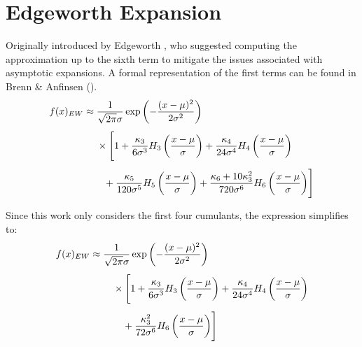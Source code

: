 \section{Edgeworth Expansion}
Originally introduced by Edgeworth \citeyear{edgeworthRepresentationStatisticalFrequency1907}, who suggested computing the approximation up to the sixth term to mitigate the issues associated with asymptotic expansions. A formal representation of the first terms can be found in Brenn \& Anfinsen (\citeyear{brennRevisitGramCharlierEdgeworth2017}).
\begin{align}
    f(x)_{EW} \approx &\; \frac{1}{\sqrt{2\pi}\sigma}\exp\left(-\frac{(x-\mu)^2}{2\sigma^2}\right) \notag\\[1ex]
    &\; \times \Biggl[ 1 
        + \frac{\kappa_3}{6\sigma^3}H_3\left(\frac{x-\mu}{\sigma}\right) + \frac{\kappa_4}{24\sigma^4}H_4\left(\frac{x-\mu}{\sigma}\right) \notag\\[1ex]
    &\quad + \frac{\kappa_5}{120\sigma^5}H_5\left(\frac{x-\mu}{\sigma}\right) + \frac{\kappa_6 + 10\kappa_3^2}{720\sigma^6}H_6\left(\frac{x-\mu}{\sigma}\right)
    \Biggr] \notag
\end{align}
    
Since this work only considers the first four cumulants, the expression simplifies to:
\begin{align}
    f(x)_{EW} \approx {} & \frac{1}{\sqrt{2\pi}\sigma}\exp\left(-\frac{(x-\mu)^2}{2\sigma^2}\right)\notag\\[1ex]
    & \quad \times \Biggl[ 1 
       + \frac{\kappa_3}{6\sigma^3}H_3\left(\frac{x-\mu}{\sigma}\right) + \frac{\kappa_4}{24\sigma^4}H_4\left(\frac{x-\mu}{\sigma}\right) \notag\\[1ex]
    \label{eq:ew_expansion_short}
    & \quad \quad + \frac{\kappa_3^2}{72\sigma^6}H_6\left(\frac{x-\mu}{\sigma}\right)
    \Biggr]
\end{align}    

